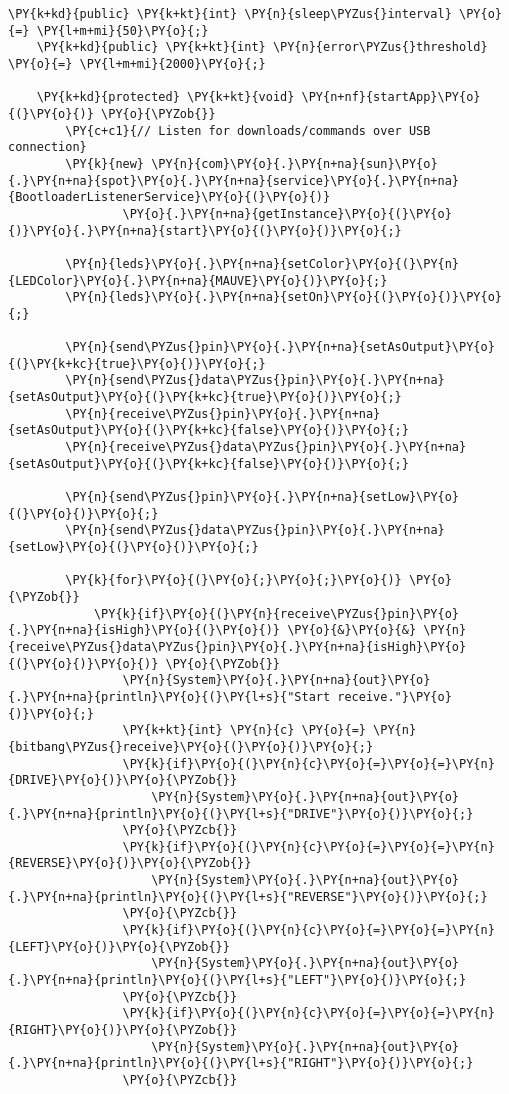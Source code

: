 \begin{Verbatim}[commandchars=\\\{\}]
    \PY{k+kd}{public} \PY{k+kt}{int} \PY{n}{sleep\PYZus{}interval} \PY{o}{=} \PY{l+m+mi}{50}\PY{o}{;}
    \PY{k+kd}{public} \PY{k+kt}{int} \PY{n}{error\PYZus{}threshold} \PY{o}{=} \PY{l+m+mi}{2000}\PY{o}{;}

    \PY{k+kd}{protected} \PY{k+kt}{void} \PY{n+nf}{startApp}\PY{o}{(}\PY{o}{)} \PY{o}{\PYZob{}}
        \PY{c+c1}{// Listen for downloads/commands over USB connection}
        \PY{k}{new} \PY{n}{com}\PY{o}{.}\PY{n+na}{sun}\PY{o}{.}\PY{n+na}{spot}\PY{o}{.}\PY{n+na}{service}\PY{o}{.}\PY{n+na}{BootloaderListenerService}\PY{o}{(}\PY{o}{)}
                \PY{o}{.}\PY{n+na}{getInstance}\PY{o}{(}\PY{o}{)}\PY{o}{.}\PY{n+na}{start}\PY{o}{(}\PY{o}{)}\PY{o}{;}

        \PY{n}{leds}\PY{o}{.}\PY{n+na}{setColor}\PY{o}{(}\PY{n}{LEDColor}\PY{o}{.}\PY{n+na}{MAUVE}\PY{o}{)}\PY{o}{;}
        \PY{n}{leds}\PY{o}{.}\PY{n+na}{setOn}\PY{o}{(}\PY{o}{)}\PY{o}{;}

        \PY{n}{send\PYZus{}pin}\PY{o}{.}\PY{n+na}{setAsOutput}\PY{o}{(}\PY{k+kc}{true}\PY{o}{)}\PY{o}{;}
        \PY{n}{send\PYZus{}data\PYZus{}pin}\PY{o}{.}\PY{n+na}{setAsOutput}\PY{o}{(}\PY{k+kc}{true}\PY{o}{)}\PY{o}{;}
        \PY{n}{receive\PYZus{}pin}\PY{o}{.}\PY{n+na}{setAsOutput}\PY{o}{(}\PY{k+kc}{false}\PY{o}{)}\PY{o}{;}
        \PY{n}{receive\PYZus{}data\PYZus{}pin}\PY{o}{.}\PY{n+na}{setAsOutput}\PY{o}{(}\PY{k+kc}{false}\PY{o}{)}\PY{o}{;}

        \PY{n}{send\PYZus{}pin}\PY{o}{.}\PY{n+na}{setLow}\PY{o}{(}\PY{o}{)}\PY{o}{;}
        \PY{n}{send\PYZus{}data\PYZus{}pin}\PY{o}{.}\PY{n+na}{setLow}\PY{o}{(}\PY{o}{)}\PY{o}{;}

        \PY{k}{for}\PY{o}{(}\PY{o}{;}\PY{o}{;}\PY{o}{)} \PY{o}{\PYZob{}}
            \PY{k}{if}\PY{o}{(}\PY{n}{receive\PYZus{}pin}\PY{o}{.}\PY{n+na}{isHigh}\PY{o}{(}\PY{o}{)} \PY{o}{&}\PY{o}{&} \PY{n}{receive\PYZus{}data\PYZus{}pin}\PY{o}{.}\PY{n+na}{isHigh}\PY{o}{(}\PY{o}{)}\PY{o}{)} \PY{o}{\PYZob{}}
                \PY{n}{System}\PY{o}{.}\PY{n+na}{out}\PY{o}{.}\PY{n+na}{println}\PY{o}{(}\PY{l+s}{"Start receive."}\PY{o}{)}\PY{o}{;}
                \PY{k+kt}{int} \PY{n}{c} \PY{o}{=} \PY{n}{bitbang\PYZus{}receive}\PY{o}{(}\PY{o}{)}\PY{o}{;}
                \PY{k}{if}\PY{o}{(}\PY{n}{c}\PY{o}{=}\PY{o}{=}\PY{n}{DRIVE}\PY{o}{)}\PY{o}{\PYZob{}}
                    \PY{n}{System}\PY{o}{.}\PY{n+na}{out}\PY{o}{.}\PY{n+na}{println}\PY{o}{(}\PY{l+s}{"DRIVE"}\PY{o}{)}\PY{o}{;}
                \PY{o}{\PYZcb{}}
                \PY{k}{if}\PY{o}{(}\PY{n}{c}\PY{o}{=}\PY{o}{=}\PY{n}{REVERSE}\PY{o}{)}\PY{o}{\PYZob{}}
                    \PY{n}{System}\PY{o}{.}\PY{n+na}{out}\PY{o}{.}\PY{n+na}{println}\PY{o}{(}\PY{l+s}{"REVERSE"}\PY{o}{)}\PY{o}{;}
                \PY{o}{\PYZcb{}}
                \PY{k}{if}\PY{o}{(}\PY{n}{c}\PY{o}{=}\PY{o}{=}\PY{n}{LEFT}\PY{o}{)}\PY{o}{\PYZob{}}
                    \PY{n}{System}\PY{o}{.}\PY{n+na}{out}\PY{o}{.}\PY{n+na}{println}\PY{o}{(}\PY{l+s}{"LEFT"}\PY{o}{)}\PY{o}{;}
                \PY{o}{\PYZcb{}}
                \PY{k}{if}\PY{o}{(}\PY{n}{c}\PY{o}{=}\PY{o}{=}\PY{n}{RIGHT}\PY{o}{)}\PY{o}{\PYZob{}}
                    \PY{n}{System}\PY{o}{.}\PY{n+na}{out}\PY{o}{.}\PY{n+na}{println}\PY{o}{(}\PY{l+s}{"RIGHT"}\PY{o}{)}\PY{o}{;}
                \PY{o}{\PYZcb{}}


\end{Verbatim}
